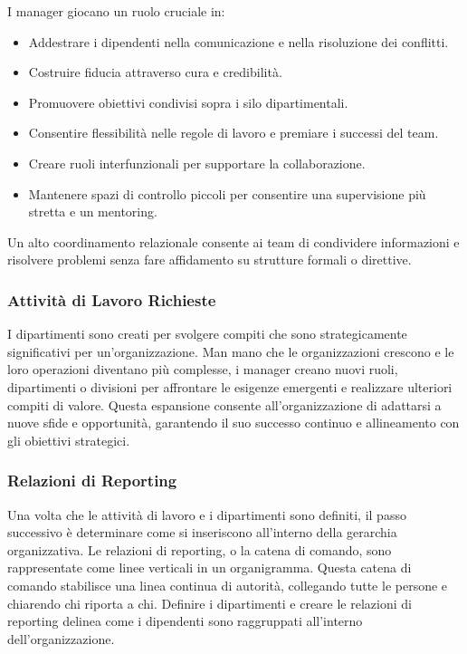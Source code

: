 \documentclass{article}
\begin{document}
I manager giocano un ruolo cruciale in:
\begin{itemize}
    \item Addestrare i dipendenti nella comunicazione e nella risoluzione dei conflitti.
    \item Costruire fiducia attraverso cura e credibilità.
    \item Promuovere obiettivi condivisi sopra i silo dipartimentali.
    \item Consentire flessibilità nelle regole di lavoro e premiare i successi del team.
    \item Creare ruoli interfunzionali per supportare la collaborazione.
    \item Mantenere spazi di controllo piccoli per consentire una supervisione più stretta e un mentoring.
\end{itemize}

Un alto coordinamento relazionale consente ai team di condividere informazioni e risolvere problemi senza fare affidamento su strutture formali o direttive.

\subsubsection{Attività di Lavoro Richieste}

I dipartimenti sono creati per svolgere compiti che sono strategicamente significativi per un'organizzazione. Man mano che le organizzazioni crescono e le loro operazioni diventano più complesse, i manager creano nuovi ruoli, dipartimenti o divisioni per affrontare le esigenze emergenti e realizzare ulteriori compiti di valore. Questa espansione consente all'organizzazione di adattarsi a nuove sfide e opportunità, garantendo il suo successo continuo e allineamento con gli obiettivi strategici.

\subsubsection{Relazioni di Reporting}

Una volta che le attività di lavoro e i dipartimenti sono definiti, il passo successivo è determinare come si inseriscono all'interno della gerarchia organizzativa. Le relazioni di reporting, o la catena di comando, sono rappresentate come linee verticali in un organigramma. Questa catena di comando stabilisce una linea continua di autorità, collegando tutte le persone e chiarendo chi riporta a chi. Definire i dipartimenti e creare le relazioni di reporting delinea come i dipendenti sono raggruppati all'interno dell'organizzazione.
\end{document}
